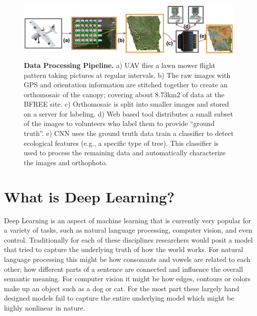 \begin{figure}[ht]
\includegraphics[width=1.0\textwidth]{Figures/Pipeline.jpg}
\caption{\textbf{Data Processing Pipeline.} a) UAV flies a lawn mower flight pattern taking pictures at regular intervals. b) The raw images with GPS and orientation information are stitched together to create an orthomosaic of the canopy; covering about 8.73km2 of data at the BFREE site. c) Orthomosaic is split into smaller images and stored on a server for labeling. d) Web based tool distributes a small subset of the images to volunteers who label them to provide “ground truth”. e) CNN uses the ground truth data train a classifier to detect ecological features (e.g., a specific type of tree). This classifier is used to process the remaining data and automatically characterize the images and orthophoto.}
\label{fig:Pipeline}
\end{figure}


\section{What is Deep Learning?}

Deep Learning is an aspect of machine learning that is currently very popular for a variety of tasks, such as natural language processing, computer vision, and even control. Traditionally for each of these disciplines researchers would posit a model that tried to capture the underlying truth of how the world works. For natural language processing this might be how consonants and vowels are related to each other; how different parts of a sentence are connected and influence the overall semantic meaning. For computer vision it might be how edges, contours or colors make up an object such as a dog or cat. For the most part these largely hand designed models fail to capture the entire underlying model which might be highly nonlinear in nature.

